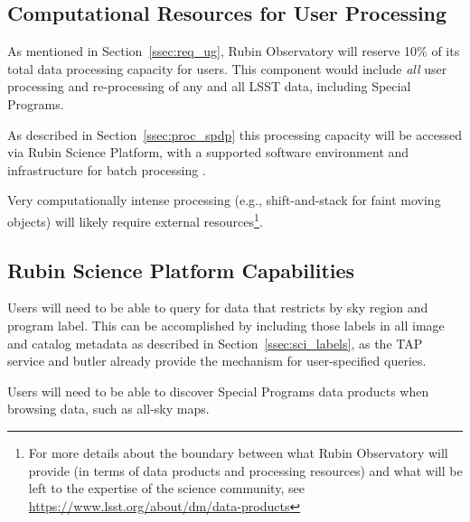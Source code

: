 \subsection{Computational Resources for User Processing}

As mentioned in Section~\ref{ssec:req_ug}, Rubin Observatory will reserve 10\% of its 
total data processing capacity for users.
This component would include {\it all} user processing and re-processing of any and 
all LSST data, including Special Programs. 

As described in Section~\ref{ssec:proc_spdp} this processing capacity will be 
accessed via Rubin Science Platform, with a supported software environment and 
infrastructure for batch processing .

Very computationally intense processing (e.g., shift-and-stack for faint moving 
objects) will likely require external resources\footnote{For more details about the boundary between what Rubin Observatory will provide (in terms of data products and processing resources) and what will be left to the expertise of the science community, see \url{https://www.lsst.org/about/dm/data-products}}.


\subsection{Rubin Science Platform Capabilities}

Users will need to be able to query for data that restricts by sky region and 
program label. 
This can be accomplished by including those labels in all image and catalog 
metadata as described in Section~\ref{ssec:sci_labels}, as the TAP service 
and butler already provide the mechanism for user-specified queries.

Users will need to be able to discover Special Programs data products when 
browsing data, such as all-sky maps. 


